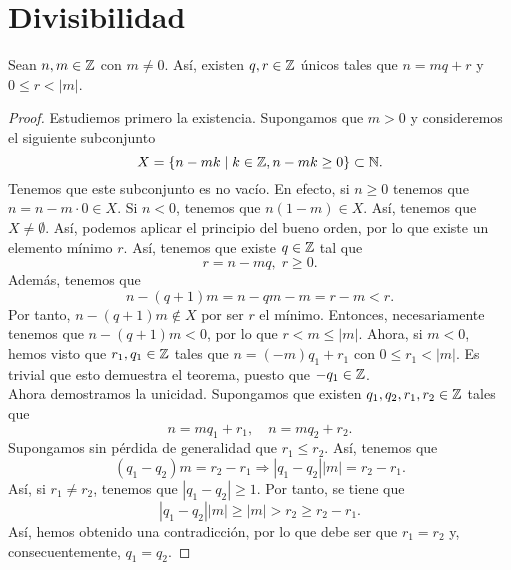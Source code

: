 \section{Divisibilidad}
\begin{theorem}
Sean $\displaystyle n, m \in \mathbb{Z} $ con $\displaystyle m \neq 0 $. Así, existen $\displaystyle q, r \in \mathbb{Z} $ únicos tales que $\displaystyle n = mq + r $ y $\displaystyle 0 \leq r < \left|m\right| $.
\end{theorem}
\begin{proof}
Estudiemos primero la existencia.
 Supongamos que $\displaystyle m > 0 $ y consideremos el siguiente subconjunto
	\[ X = \left\{ n - mk \; | \; k \in \mathbb{Z}, n -mk \geq 0\right\} \subset \mathbb{N} .\]
Tenemos que este subconjunto es no vacío. En efecto, si $\displaystyle n \geq 0 $ tenemos que $\displaystyle n = n - m \cdot 0 \in X$. Si $\displaystyle n < 0 $, tenemos que $\displaystyle n\left(1 - m\right) \in X $. Así, tenemos que $\displaystyle X \neq \emptyset $. Así, podemos aplicar el principio del bueno orden, por lo que existe un elemento mínimo $\displaystyle r $. Así, tenemos que existe $\displaystyle q \in \mathbb{Z} $ tal que 
\[r = n - mq, \; r \geq 0 .\]
Además, tenemos que 
\[n - \left(q+1\right)m = n - qm - m = r - m < r .\]
Por tanto, $\displaystyle n - \left(q+1\right)m \not\in X $ por ser $\displaystyle r $ el mínimo. Entonces, necesariamente tenemos que $\displaystyle n - \left(q+1\right)m < 0 $, por lo que $\displaystyle r < m \leq \left|m\right| $. Ahora, si $\displaystyle m < 0 $, hemos visto que $\displaystyle r_{1}, q_{1} \in \mathbb{Z} $ tales que $\displaystyle n = \left(-m\right)q_{1}+r_{1} $ con $\displaystyle 0\leq r_{1} < \left|m\right| $. Es trivial que esto demuestra el teorema, puesto que $\displaystyle -q_{1} \in \mathbb{Z} $. \\
Ahora demostramos la unicidad. Supongamos que existen $\displaystyle q_{1}, q_{2}, r_{1}, r_{2} \in \mathbb{Z} $ tales que 
\[n = mq_{1} + r_{1} , \quad n = mq_{2} +r_{2} .\]
Supongamos sin pérdida de generalidad que $\displaystyle r_{1} \leq r_{2} $. Así, tenemos que
\[\left(q_{1}-q_{2}\right)m = r_{2}-r_{1} \Rightarrow \left|q_{1}-q_{2}\right| \left|m\right| = r_{2}-r_{1} .\]
Así, si $\displaystyle r_{1} \neq r_{2} $, tenemos que $\displaystyle \left|q_{1}-q_{2}\right| \geq 1 $. Por tanto, se tiene que
\[ \left|q_{1}-q_{2}\right| \left|m\right| \geq \left|m\right| > r_{2} \geq r_{2}-r_{1}.\]
Así, hemos obtenido una contradicción, por lo que debe ser que $\displaystyle r_{1} = r_{2} $ y, consecuentemente, $\displaystyle q_{1} = q_{2} $.
\end{proof}
